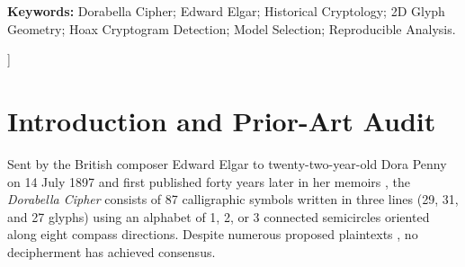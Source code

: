 \documentclass[10pt,a4paper,twocolumn]{article}
\newcommand{\code}[1]{\texttt{\small #1}}
\begin{document}
\begin{@twocolumnfalse}
\begin{abstract}
Leave-one-out cross-validation (LOO-CV) across the 86 orientation transitions confirms that a parsimonious 4-parameter calligraphic model (\code{W/V} posture + $180^\circ$ mirror reflex) gains $+12.03$~nats over independence (Bayes factor $\approx 167{,}000:1$), outperforming a full $8\times 8$ Markov chain ($+7.81$~nats) and an optimal 1D conjunct musical chain ($+8.59$~nats). Finally, augmenting 12 Foxon-style 1D features with our four 2D features lifts RBF-SVM/MLP cross-validation accuracy from $93.4\%$ to $99.94\%$ ($\mathrm{AUC}=0.9999$): Dorabella flips from $P(\mathrm{English}\mid\mathrm{1D}) = 0.772/0.973$ to $P(\mathrm{English}\mid\mathrm{1D{+}2D}) = 0.0008/0.0016$ across all three transcriptions, while Elgar's real \emph{Marco Notebook} ciphertext moves in the opposite direction to $P(\mathrm{English}\mid\mathrm{1D{+}2D}) = 1.0000$.
\end{abstract}
\vspace{0.25cm}
\noindent\textbf{\small Keywords:} {\small Dorabella Cipher; Edward Elgar; Historical Cryptology; 2D Glyph Geometry; Hoax Cryptogram Detection; Model Selection; Reproducible Analysis.}
\vspace{0.35cm}
\end{@twocolumnfalse}
]

\section{Introduction and Prior-Art Audit}
\label{sec:intro}

Sent by the British composer Edward Elgar to twenty-two-year-old Dora Penny on 14 July 1897 and first published forty years later in her memoirs \citep{powell1937memories}, the \emph{Dorabella Cipher} consists of 87 calligraphic symbols written in three lines (29, 31, and 27 glyphs) using an alphabet of 1, 2, or 3 connected semicircles oriented along eight compass directions. Despite numerous proposed plaintexts \citep[e.g.,][]{sams1970dorabella}, no decipherment has achieved consensus.
\end{document}
